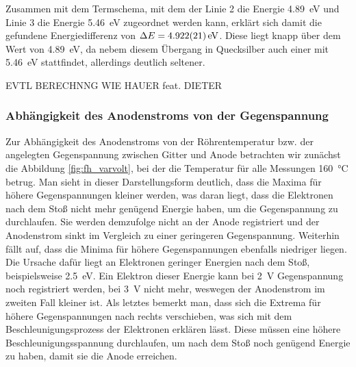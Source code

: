 \documentclass[11pt, a4paper]{article}
\begin{document}
Zusammen mit dem Termschema, mit dem der Linie 2 die Energie \SI{4.89}{\electronvolt} und Linie 3 die Energie \SI{5.46}{\electronvolt} zugeordnet werden kann, erklärt sich damit die gefundene Energiedifferenz von $\Delta E = \SI{4.922+-0.021}{\electronvolt}$.
Diese liegt knapp über dem Wert von \SI{4.89}{\electronvolt}, da nebem diesem Übergang in Quecksilber auch einer mit \SI{5.46}{\electronvolt} stattfindet, allerdings deutlich seltener.

EVTL BERECHNNG WIE HAUER feat. DIETER

\subsubsection{Abhängigkeit des Anodenstroms von der Gegenspannung}

Zur Abhängigkeit des Anodenstroms von der Röhrentemperatur bzw. der angelegten Gegenspannung zwischen Gitter und Anode betrachten wir zunächst die Abbildung \ref{fig:fh_varvolt}, bei der die Temperatur für alle Messungen \SI{160}{\degreeCelsius} betrug.
Man sieht in dieser Darstellungsform deutlich, dass die Maxima für höhere Gegenspannungen kleiner werden, was daran liegt, dass die Elektronen nach dem Stoß nicht mehr genügend Energie haben, um die Gegenspannung zu durchlaufen.
Sie werden demzufolge nicht an der Anode registriert und der Anodenstrom sinkt im Vergleich zu einer geringeren Gegenspannung.
Weiterhin fällt auf, dass die Minima für höhere Gegenspannungen ebenfalls niedriger liegen.
Die Ursache dafür liegt an Elektronen geringer Energien nach dem Stoß, beispielsweise \SI{2.5}{\electronvolt}.
Ein Elektron dieser Energie kann bei \SI{2}{\volt} Gegenspannung noch registriert werden, bei \SI{3}{\volt} nicht mehr, weswegen der Anodenstrom im zweiten Fall kleiner ist.
Als letztes bemerkt man, dass sich die Extrema für höhere Gegenspannungen nach rechts verschieben, was sich mit dem Beschleunigungsprozess der Elektronen erklären lässt.
Diese müssen eine höhere Beschleunigungsspannung durchlaufen, um nach dem Stoß noch genügend Energie zu haben, damit sie die Anode erreichen.
\end{document}
